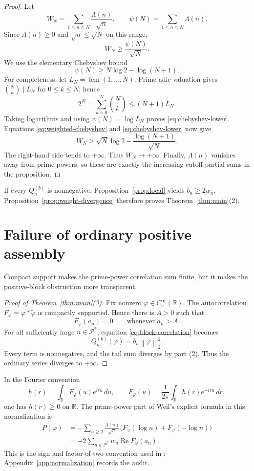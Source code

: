 \documentclass[11pt,a4paper]{amsart}
\newcommand{\R}{\mathbb{R}}
\newcommand{\PP}{\mathcal{P}^{\!*}}
\newcommand{\norm}[1]{\left\lVert #1\right\rVert_{2}}
\theoremstyle{plain}
\theoremstyle{definition}
\begin{document}
\begin{proof}
Let
\[
 W_N=\sum_{1\leq n\leq N}\frac{\Lambda(n)}{\sqrt n},
 \qquad
 \psi(N)=\sum_{1\leq n\leq N}\Lambda(n).
\]
Since $\Lambda(n)\geq0$ and $\sqrt n\leq\sqrt N$ on this range,
\begin{equation}\label{eq:weighted-chebyshev}
 W_N\geq\frac{\psi(N)}{\sqrt N}.
\end{equation}
We use the elementary Chebyshev bound
\begin{equation}\label{eq:chebyshev-lower}
 \psi(N)\geq N\log 2-\log(N+1).
\end{equation}
For completeness, let $L_N=\operatorname{lcm}(1,\ldots,N)$.  Prime-adic
valuation gives $\binom Nk\mid L_N$ for $0\leq k\leq N$; hence
\[
 2^N=\sum_{k=0}^{N}\binom Nk\leq(N+1)L_N.
\]
Taking logarithms and using $\psi(N)=\log L_N$ proves
\eqref{eq:chebyshev-lower}.  Equations \eqref{eq:weighted-chebyshev} and
\eqref{eq:chebyshev-lower} now give
\[
 W_N\geq \sqrt N\log2-\frac{\log(N+1)}{\sqrt N}.
\]
The right-hand side tends to $+\infty$.  Thus $W_N\to+\infty$.  Finally,
$\Lambda(n)$ vanishes away from prime powers, so these are exactly the
increasing-cutoff partial sums in the proposition.
\end{proof}

If every $Q_n^{(b)}$ is nonnegative, Proposition~\ref{prop:local} yields
$b_n\geq2w_n$.  Proposition~\ref{prop:weight-divergence} therefore proves
Theorem~\ref{thm:main}(2).

\section{Failure of ordinary positive assembly}

Compact support makes the prime-power correlation sum finite, but it makes the
positive-block obstruction more transparent.

\begin{proof}[Proof of Theorem~\ref{thm:main}(3)]
Fix nonzero $\varphi\in C_c^\infty(\R)$.  The autocorrelation
$F_\varphi=\varphi*\widetilde\varphi$ is compactly supported.  Hence there is
$A>0$ such that
\[
 F_\varphi(a_n)=0\qquad\text{whenever }a_n>A.
\]
For all sufficiently large $n\in\PP$, equation
\eqref{eq:block-correlation} becomes
\[
 Q_n^{(b)}(\varphi)=b_n\norm{\varphi}^{2}.
\]
Every term is nonnegative, and the tail sum diverges by part (2).  Thus the
ordinary series diverges to $+\infty$.
\end{proof}

In the Fourier convention
\[
 h(r)=\int_{\R}F_\varphi(u)e^{iru}\,du,
 \qquad
 F_\varphi(u)=\frac{1}{2\pi}\int_{\R}h(r)e^{-iru}\,dr,
\]
one has $h(r)\geq0$ on $\R$.  The prime-power part of Weil's explicit formula
in this normalization is
\begin{align}
 P(\varphi)
 &=-\sum_{n\geq2}\frac{\Lambda(n)}{\sqrt n}
     \bigl(F_\varphi(\log n)+F_\varphi(-\log n)\bigr) \label{eq:prime-pair}\\
 &=-2\sum_{n\in\PP}w_n\operatorname{Re}F_\varphi(a_n). \label{eq:prime-real}
\end{align}
This is the sign and factor-of-two convention used in
\cite{Conrey2003}; Appendix~\ref{app:normalization} records the audit.
\end{document}
